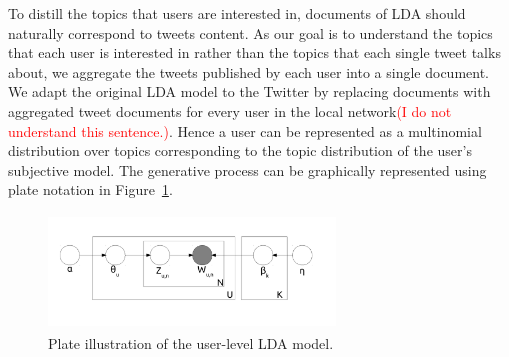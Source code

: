 \documentclass{acm_proc_article-sp}
\newcommand{\mo}[1]{\textcolor{red}{#1}}
\begin{document}

To distill the topics that users are interested in, documents of LDA should naturally correspond to tweets content. 
As our goal is to understand the topics that each user is interested in rather than the topics that each single tweet talks about, we aggregate the tweets published by each user into a single document. 
We adapt the original LDA model to the Twitter by replacing documents with aggregated tweet documents for every user in the local network\mo{(I do not understand this sentence.)}. 
Hence a user can be represented as a multinomial distribution over topics corresponding to the topic distribution of the user's subjective model.
The generative process can be graphically represented using plate notation in Figure~\ref{fig:graph2}. 

\begin{figure}[htb]
\centering
\includegraphics[width=3.0in,height=1.2in]{LDA.pdf}
\caption{Plate illustration of the user-level LDA model.}
\label{fig:graph2}
\end{figure}
\end{document}
